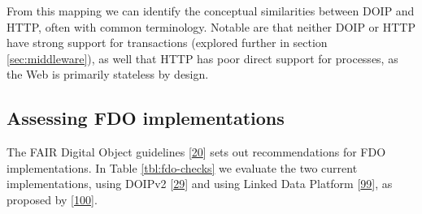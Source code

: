 From this mapping we can identify the conceptual similarities between DOIP and HTTP, often with common terminology. Notable are that neither DOIP or HTTP have strong support for transactions (explored further in section \ref{sec:middleware}), as well that HTTP has poor direct support for processes, as the Web is primarily stateless by design.

\hypertarget{sec:doip-fdo-compare}{%
\subsection{Assessing FDO implementations}\label{sec:doip-fdo-compare}}

The FAIR Digital Object guidelines {[}\protect\hyperlink{ref-RwvirqWg}{20}{]} sets out recommendations for FDO implementations. In Table \ref{tbl:fdo-checks} we evaluate the two current implementations, using DOIPv2 {[}\protect\hyperlink{ref-13TcbsZF6}{29}{]} and using Linked Data Platform {[}\protect\hyperlink{ref-17OHlMRQA}{99}{]}, as proposed by {[}\protect\hyperlink{ref-7szz7dwO}{100}{]}.

